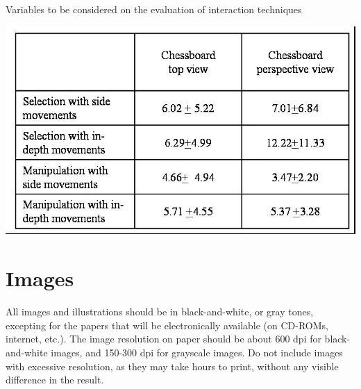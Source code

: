 \documentclass[12pt]{article}
\begin{document}
\begin{table}[ht]
\centering
\caption{Variables to be considered on the evaluation of interaction
  techniques}
\label{tab:exTable1}
\includegraphics[width=.7\textwidth]{table.jpg}
\end{table}

\section{Images}

All images and illustrations should be in black-and-white, or gray tones,
excepting for the papers that will be electronically available (on CD-ROMs,
internet, etc.). The image resolution on paper should be about 600 dpi for
black-and-white images, and 150-300 dpi for grayscale images.  Do not include
images with excessive resolution, as they may take hours to print, without any
visible difference in the result.



\end{document}

